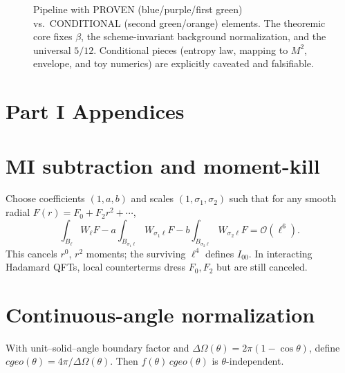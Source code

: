 \documentclass[aps,prd,onecolumn,superscriptaddress,nofootinbib]{revtex4-2}
\def\cgeo{cgeo}%
\def\Omega_\Lambda{OmegaLambda}%
\providecommand{\cgeo}{c_{\rm geo}}
\providecommand{\be}{\begin{equation}}
\providecommand{\ee}{\end{equation}}
\begin{document}
\begin{figure*}[t]
\begin{adjustbox}{max width=\linewidth}
\end{adjustbox}
\caption{Pipeline with PROVEN (blue/purple/first green) vs.\ CONDITIONAL (second green/orange) elements. The theoremic core fixes \(\beta\), the scheme-invariant background normalization, and the universal \(5/12\). Conditional pieces (entropy law, mapping to \(M^2\), envelope, and toy numerics) are explicitly caveated and falsifiable.}
\label{fig:pipeline}
\end{figure*}

\section*{Part I Appendices}

\section{MI subtraction and moment-kill}
\label{app:MI}
Choose coefficients \((1,a,b)\) and scales \((1,\sigma_1,\sigma_2)\) such that for any smooth radial \(F(r)=F_0+F_2 r^2+\cdots\),
\be
\int_{B_\ell}\!W_\ell F
- a\!\int_{B_{\sigma_1\ell}}\!W_{\sigma_1\ell}F
- b\!\int_{B_{\sigma_2\ell}}\!W_{\sigma_2\ell}F
=\mathcal O(\ell^6).
\ee
This cancels \(r^0\), \(r^2\) moments; the surviving \(\ell^4\) defines \(I_{00}\). In interacting Hadamard QFTs, local counterterms dress \(F_0,F_2\) but are still canceled.

\section{Continuous-angle normalization}
\label{app:angle}
With unit–solid–angle boundary factor and \(\Delta\Omega(\theta)=2\pi(1-\cos\theta)\), define \(\cgeo(\theta)=4\pi/\Delta\Omega(\theta)\). Then \(f(\theta)\,\cgeo(\theta)\) is \(\theta\)-independent.
\end{document}

